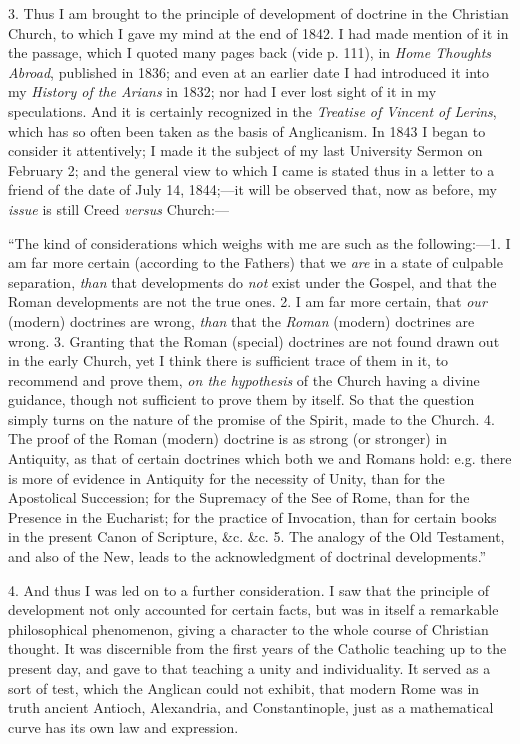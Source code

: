 3. Thus I am brought to the principle of development of
doctrine in the Christian Church, to which I gave my mind at the end of
1842. I had made mention of it in the passage, which I quoted many
pages back (vide p. 111), in \emph{Home Thoughts Abroad}, published in
1836; and even at an earlier date I had introduced it into my \emph{History of the Arians} in 1832; nor had I
ever lost sight of it in my speculations. And it is certainly recognized in
the \emph{Treatise of Vincent of Lerins}, which has so often been taken as the basis of Anglicanism. In 1843
I began to consider it attentively; I made it the subject of
my last University Sermon on February 2; and the general view to
which I came is stated thus in a letter to a friend of the date of July
14, 1844;—it will be observed that, now as before, my \emph{issue}
is still Creed \emph{versus} Church:—

``The kind of considerations which weighs with me are
such as the following:—1. I am far more certain (according to the
Fathers) that we \emph{are} in a state of culpable separation, \emph{than}
that developments do \emph{not} exist under the Gospel, and that the
Roman developments are not the true ones. 2. I am far more certain, that
\emph{our} (modern) doctrines are wrong, \emph{than} that the \emph{Roman}
(modern) doctrines are wrong. 3. Granting that the Roman (special)
doctrines are not found drawn out in the early Church, yet I think there
is sufficient trace of them in it, to recommend and prove them, \emph{on
the hypothesis} of the Church having a divine guidance, though not
sufficient to prove them by itself. So that the question simply turns on
the nature of the promise of the Spirit, made to the Church. 4. The
proof of the Roman (modern) doctrine is as strong (or stronger) in
Antiquity, as that of certain doctrines which both we and Romans hold:
e.g. there is more of evidence in Antiquity for the necessity of Unity,
than for the Apostolical Succession; for the Supremacy of the See of
Rome, than for the Presence in the Eucharist; for the practice of
Invocation, than for certain books in the present Canon of Scripture,
\&c. \&c. 5. The analogy of the Old Testament, and also of the
New, leads to the acknowledgment of doctrinal developments.''

4. And thus I was led on to a further consideration. I saw
that the principle of development not only accounted for certain facts,
but was in itself a remarkable philosophical phenomenon, giving a
character to the whole course of Christian thought. It was discernible
from the first years of the Catholic teaching up to the present day, and
gave to that teaching a unity and individuality. It served as a sort of
test, which the Anglican could not exhibit, that modern Rome was in
truth ancient Antioch, Alexandria, and Constantinople, just as a mathematical curve has its
own law and expression.

